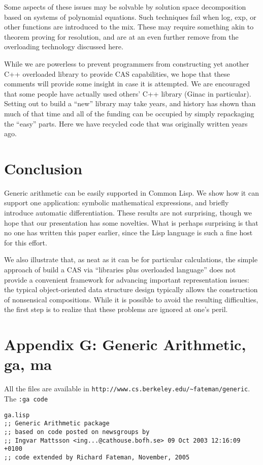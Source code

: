 \documentclass{article}
\begin{document}
{{Some aspects of these issues may be solvable by solution space
decomposition based on systems of polynomial equations. Such
techniques fail when log, exp, or other functions are introduced to
the mix.  These may require something akin to theorem proving for
resolution, and are at an even further remove from the overloading
technology discussed here.

While we are powerless to prevent programmers from constructing yet
another C++ overloaded library to provide CAS capabilities, we hope
that these comments will provide some insight in case it is
attempted. We are encouraged that some people have actually used
others' C++ library (Ginac in particular).  Setting out to build a
``new'' library may take years, and history has shown than
much of that time and all of the funding can be occupied by
simply repackaging the ``easy'' parts. Here we have recycled code
that was originally written years ago.}

{\section {Conclusion}

Generic arithmetic can be easily supported in Common Lisp.  We show
how it can support one application: symbolic mathematical expressions, and briefly
introduce automatic differentiation.  These results are not
surprising, though we hope that our presentation has some novelties.
What is perhaps surprising is that no one has written this paper
earlier, since the Lisp language is such a fine host for this effort.

We also illustrate that, as neat as it can be for particular calculations, 
the simple approach of build a CAS via ``libraries plus overloaded language'' 
does not provide a convenient framework for advancing important representation issues:
the typical object-oriented data structure design typically allows the construction
of nonsensical compositions. While it is possible to avoid the resulting difficulties,
the first step is to realize that these problems are ignored at one's peril.
}

\section* {Appendix G: Generic Arithmetic, ga, ma}
All the files are available in \verb|http://www.cs.berkeley.edu/~fateman/generic|.
The {\tt :ga code}  
\begin{verbatim}
ga.lisp 
;; Generic Arithmetic package
;; based on code posted on newsgroups by
;; Ingvar Mattsson <ing...@cathouse.bofh.se> 09 Oct 2003 12:16:09 +0100
;; code extended by Richard Fateman, November, 2005


\end{verbatim}}
\end{document}

